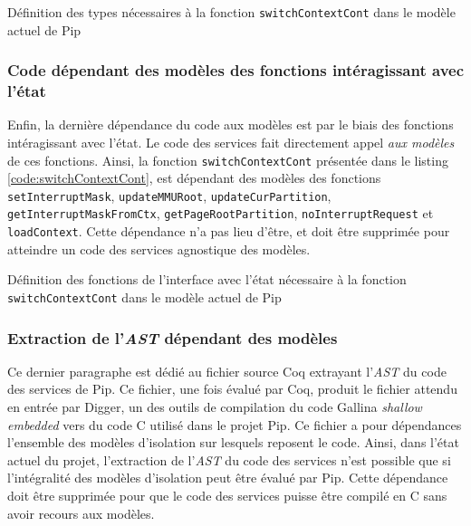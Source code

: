 			\begin{listing}[!ht]
				\caption{Définition des types nécessaires à la fonction \texttt{switchContextCont} dans le modèle actuel de Pip}
				\label{code:CurrentTypesModel}
			\end{listing}

			\subsubsection{Code dépendant des modèles des fonctions intéragissant avec l'état}
			Enfin, la dernière dépendance du code aux modèles est par le biais des fonctions intéragissant avec l'état. Le code des services fait directement appel \emph{aux modèles} de ces fonctions. Ainsi, la fonction \texttt{switchContextCont} présentée dans le listing \ref{code:switchContextCont}, est dépendant des modèles des fonctions \texttt{setInterruptMask}, \texttt{updateMMURoot}, \texttt{updateCurPartition}, \texttt{getInterruptMaskFromCtx}, \texttt{getPageRootPartition}, \texttt{noInterruptRequest} et \texttt{loadContext}. Cette dépendance n'a pas lieu d'être, et doit être supprimée pour atteindre un code des services agnostique des modèles.

			\begin{listing}[!ht]
				\caption{Définition des fonctions de l'interface avec l'état nécessaire à la fonction \texttt{switchContextCont} dans le modèle actuel de Pip}
				\label{code:CurrentFunctionsModel}
			\end{listing}

			\subsubsection{Extraction de l'\emph{AST} dépendant des modèles}
			\label{sec:AST_extr}
			Ce dernier paragraphe est dédié au fichier source Coq extrayant l'\emph{AST} du code des services de Pip. Ce fichier, une fois évalué par Coq, produit le fichier attendu en entrée par Digger, un des outils de compilation du code Gallina \emph{shallow embedded} vers du code C utilisé dans le projet Pip. Ce fichier a pour dépendances l'ensemble des modèles d'isolation sur lesquels reposent le code. Ainsi, dans l'état actuel du projet, l'extraction de l'\emph{AST} du code des services n'est possible que si l'intégralité des modèles d'isolation peut être évalué par Pip. Cette dépendance doit être supprimée pour que le code des services puisse être compilé en C sans avoir recours aux modèles.

